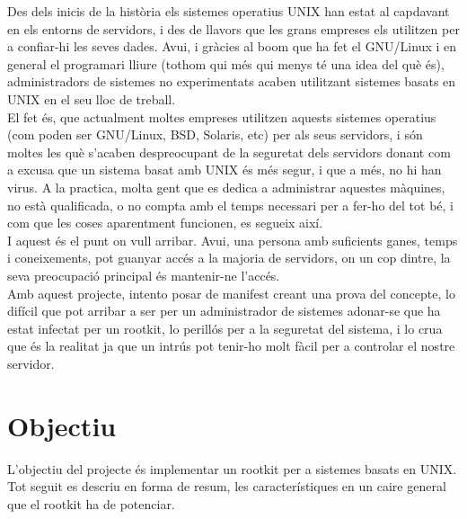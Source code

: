 Des dels inicis de la història els sistemes operatius UNIX han estat al capdavant en els
entorns de servidors, i des de llavors que les grans empreses els utilitzen per a confiar-hi
les seves dades. Avui, i gràcies al boom que ha fet el GNU/Linux i en general el programari lliure (tothom qui més qui
menys té una idea del què és), administradors de sistemes no experimentats acaben
utilitzant sistemes basats en UNIX en el seu lloc de treball. \\
El fet és, que actualment moltes empreses utilitzen aquests sistemes operatius (com poden ser
GNU/Linux, BSD, Solaris, etc) per als seus servidors, i són moltes les què s'acaben despreocupant
de la seguretat dels servidors donant com a excusa que un sistema basat amb UNIX és
més segur, i que a més, no hi han virus. A la practica, molta gent que es dedica a
administrar aquestes màquines, no està qualificada, o no compta amb el temps necessari
per a fer-ho del tot bé, i com que les coses aparentment funcionen, es segueix així. \\

I aquest és el punt on vull arribar. Avui, una persona amb suficients ganes, temps i
coneixements, pot guanyar accés a la majoria de servidors, on un cop dintre, la seva
preocupació principal és mantenir-ne l'accés.\\

Amb aquest projecte, intento posar de manifest creant una prova del concepte, lo difícil
que pot arribar a ser per un administrador de sistemes adonar-se que ha estat infectat per
un rootkit, lo perillós per a la seguretat del sistema, i lo crua que és la realitat ja que un
intrús pot tenir-ho molt fàcil per a controlar el nostre servidor.

\section{Objectiu}

L'objectiu del projecte és implementar un rootkit per a sistemes basats en UNIX. Tot seguit
es descriu en forma de resum, les característiques en un caire general que el rootkit ha de potenciar. 

